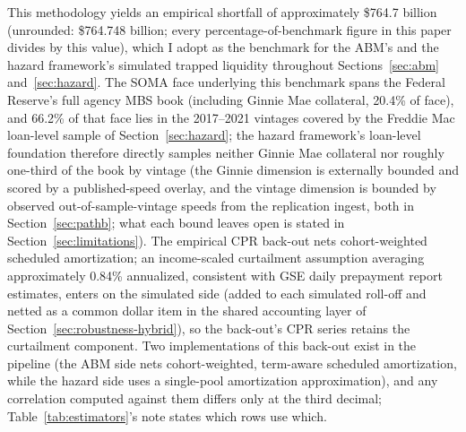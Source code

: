 \documentclass[12pt]{article}
\begin{document}
This methodology yields an empirical shortfall of approximately \$764.7 billion (unrounded: \$764.748 billion; every percentage-of-benchmark figure in this paper divides by this value), which I adopt as the benchmark for the ABM's and the hazard framework's simulated trapped liquidity throughout Sections~\ref{sec:abm} and~\ref{sec:hazard}. The SOMA face underlying this benchmark spans the Federal Reserve's full agency MBS book (including Ginnie Mae collateral, 20.4\% of face), and 66.2\% of that face lies in the 2017--2021 vintages covered by the Freddie Mac loan-level sample of Section~\ref{sec:hazard}; the hazard framework's loan-level foundation therefore directly samples neither Ginnie Mae collateral nor roughly one-third of the book by vintage (the Ginnie dimension is externally bounded and scored by a published-speed overlay, and the vintage dimension is bounded by observed out-of-sample-vintage speeds from the replication ingest, both in Section~\ref{sec:pathb}; what each bound leaves open is stated in Section~\ref{sec:limitations}). The empirical CPR back-out nets cohort-weighted scheduled amortization; an income-scaled curtailment assumption averaging approximately 0.84\% annualized, consistent with GSE daily prepayment report estimates, enters on the simulated side (added to each simulated roll-off and netted as a common dollar item in the shared accounting layer of Section~\ref{sec:robustness-hybrid}), so the back-out's CPR series retains the curtailment component. Two implementations of this back-out exist in the pipeline (the ABM side nets cohort-weighted, term-aware scheduled amortization, while the hazard side uses a single-pool amortization approximation), and any correlation computed against them differs only at the third decimal; Table~\ref{tab:estimators}'s note states which rows use which. 
\end{document}
